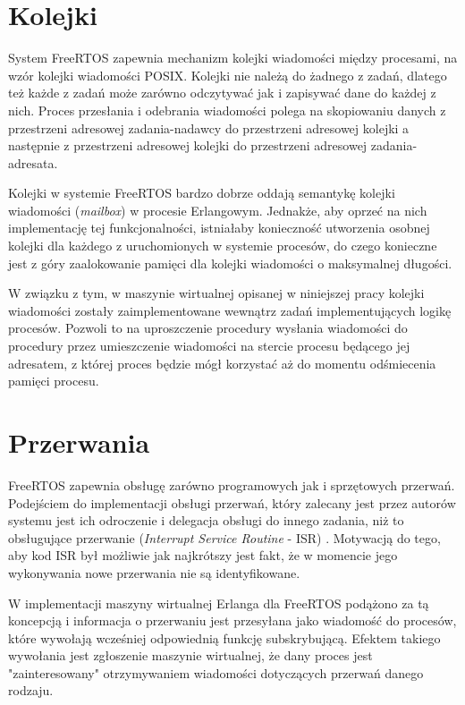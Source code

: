 \section{Kolejki}
\label{sec:rtosKolejki}

System FreeRTOS zapewnia mechanizm kolejki wiadomości między procesami, na wzór kolejki wiadomości POSIX. Kolejki nie należą do żadnego z zadań, dlatego też każde z zadań może zarówno odczytywać jak i zapisywać dane do każdej z nich. Proces przesłania i odebrania wiadomości polega na skopiowaniu danych z przestrzeni adresowej zadania-nadawcy do przestrzeni adresowej kolejki a następnie z przestrzeni adresowej kolejki do przestrzeni adresowej zadania-adresata.

Kolejki w systemie FreeRTOS bardzo dobrze oddają semantykę kolejki wiadomości (\emph{mailbox}) w procesie Erlangowym. Jednakże, aby oprzeć na nich implementację tej funkcjonalności, istniałaby konieczność utworzenia osobnej kolejki dla każdego z uruchomionych w systemie procesów, do czego konieczne jest z góry zaalokowanie pamięci dla kolejki wiadomości o maksymalnej długości.

W związku z tym, w maszynie wirtualnej opisanej w niniejszej pracy kolejki wiadomości zostały zaimplementowane wewnątrz zadań implementujących logikę procesów. Pozwoli to na uproszczenie procedury wysłania wiadomości do procedury przez umieszczenie wiadomości na stercie procesu będącego jej adresatem, z której proces będzie mógł korzystać aż do momentu odśmiecenia pamięci procesu. 

\section{Przerwania}
\label{sec:rtosPrzerwania}

FreeRTOS zapewnia obsługę zarówno programowych jak i sprzętowych przerwań. Podejściem do implementacji obsługi przerwań, który zalecany jest przez autorów systemu jest ich odroczenie i delegacja obsługi do innego zadania, niż to obsługujące przerwanie (\emph{Interrupt Service Routine} - ISR) \cite{Barry2011}. Motywacją do tego, aby kod ISR był możliwie jak najkrótszy jest fakt, że w momencie jego wykonywania nowe przerwania nie są identyfikowane.

W implementacji maszyny wirtualnej Erlanga dla FreeRTOS podążono za tą koncepcją i informacja o przerwaniu jest przesyłana jako wiadomość do procesów, które wywołają wcześniej odpowiednią funkcję subskrybującą. Efektem takiego wywołania jest zgłoszenie maszynie wirtualnej, że dany proces jest "zainteresowany" otrzymywaniem wiadomości dotyczących przerwań danego rodzaju. 

